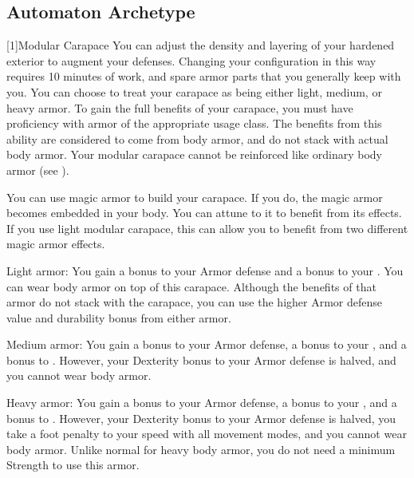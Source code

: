   \subsection{Automaton Archetype}

    [1]{Modular Carapace} You can adjust the density and layering of your hardened exterior to augment your defenses.
      Changing your configuration in this way requires 10 minutes of work, and spare armor parts that you generally keep with you.
      You can choose to treat your carapace as being either light, medium, or heavy armor.
      To gain the full benefits of your carapace, you must have proficiency with armor of the appropriate usage class.
      The benefits from this ability are considered to come from body armor, and do not stack with actual body armor.
      Your modular carapace cannot be reinforced like ordinary body armor (see ).

      You can use magic armor to build your carapace.
      If you do, the magic armor becomes embedded in your body.
      You can attune to it to benefit from its effects.
      If you use light modular carapace, this can allow you to benefit from two different magic armor effects.

      \begin{raggeditemize}
        \item Light armor: You gain a  bonus to your Armor defense and a  bonus to your .
          You can wear body armor on top of this carapace.
          Although the benefits of that armor do not stack with the carapace, you can use the higher Armor defense value and durability bonus from either armor.
        \item Medium armor: You gain a  bonus to your Armor defense, a  bonus to your , and a  bonus to .
          However, your Dexterity bonus to your Armor defense is halved, and you cannot wear body armor.
        \item Heavy armor: You gain a  bonus to your Armor defense, a  bonus to your , and a  bonus to .
          However, your Dexterity bonus to your Armor defense is halved, you take a  foot penalty to your speed with all movement modes, and you cannot wear body armor.
          Unlike normal for heavy body armor, you do not need a minimum Strength to use this armor.
      \end{raggeditemize}

